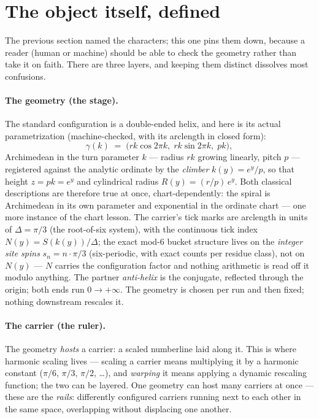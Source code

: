\documentclass[11pt]{article}
\begin{document}
\section{The object itself, defined}

The previous section named the characters; this one pins them down, because a
reader (human or machine) should be able to check the geometry rather than take
it on faith.  There are three layers, and keeping them distinct dissolves most
confusions.

\paragraph{The geometry (the stage).}  The standard configuration is a
double-ended helix, and here is its actual parametrization (machine-checked,
with its arclength in closed form):
\[
\gamma(k) \;=\; \bigl(r k\cos 2\pi k,\; r k\sin 2\pi k,\; p k\bigr),
\]
Archimedean in the turn parameter $k$ --- radius $rk$ growing linearly, pitch
$p$ --- registered against the analytic ordinate by the \emph{climber}
$k(y)=e^{y}/p$, so that height $z=pk=e^{y}$ and cylindrical radius
$R(y)=(r/p)\,e^{y}$.  Both classical descriptions are therefore true at once,
chart-dependently: the spiral is Archimedean in its own parameter and
exponential in the ordinate chart --- one more instance of the chart lesson.
The carrier's tick marks are arclength in units of $\Delta=\pi/3$ (the
root-of-six system), with the continuous tick index $N(y)=S(k(y))/\Delta$; the
exact mod-6 bucket structure lives on the \emph{integer site spins}
$s_n=n\cdot\pi/3$ (six-periodic, with exact counts per residue class), not on
$N(y)$ --- $N$ carries the configuration factor and nothing arithmetic is read
off it modulo anything.  The partner \emph{anti-helix} is the conjugate,
reflected through the origin; both ends run $0\to+\infty$.  The geometry is
chosen per run and then fixed; nothing downstream rescales it.

\paragraph{The carrier (the ruler).}  The geometry \emph{hosts} a carrier: a
scaled numberline laid along it.  This is where harmonic scaling lives ---
scaling a carrier means multiplying it by a harmonic constant ($\pi/6$,
$\pi/3$, $\pi/2$, \dots), and \emph{warping} it means applying a dynamic
rescaling function; the two can be layered.  One geometry can host many
carriers at once --- these are the \emph{rails}: differently configured
carriers running next to each other in the same space, overlapping without
displacing one another.
\end{document}
